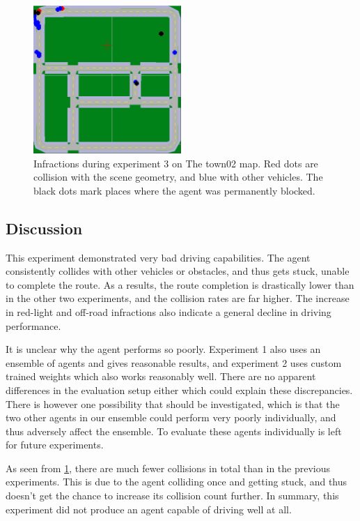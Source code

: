 \begin{figure}
    \centering
    \includegraphics[width=0.5\textwidth]{figures/results/exp3-town02.png}
    \caption{Infractions during experiment 3 on The town02 map.
    Red dots are collision with the scene geometry,
    and blue with other vehicles.
    The black dots mark places where the agent was permanently blocked.}
    \label{fig:exp3:town02}
\end{figure}


\subsection{Discussion}

This experiment demonstrated very bad driving capabilities.
The agent consistently collides with other vehicles or obstacles,
and thus gets stuck, unable to complete the route.
As a results, the route completion is drastically lower than in the other two experiments,
and the collision rates are far higher.
The increase in red-light and off-road infractions
also indicate a general decline in driving performance.

It is unclear why the agent performs so poorly.
Experiment 1 also uses an ensemble of agents and gives reasonable results,
and experiment 2 uses custom trained weights which also works reasonably well.
There are no apparent differences in the evaluation setup either which could explain these discrepancies.
There is however one possibility that should be investigated,
which is that the two other agents in our ensemble could perform very poorly individually,
and thus adversely affect the ensemble.
To evaluate these agents individually is left for future experiments.

As seen from \cref{fig:exp3:town02},
there are much fewer collisions in total than in the previous experiments.
This is due to the agent colliding once and getting stuck,
and thus doesn't get the chance to increase its collision count further.
In summary, this experiment did not produce an agent capable of driving well at all.
